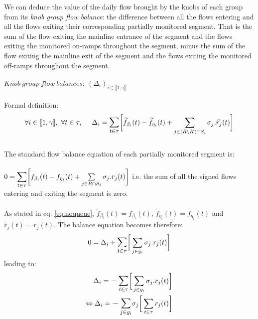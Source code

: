 We can deduce the value of the daily flow brought by the knobs of each group from its \emph{knob group flow balance}: the difference between all the flows entering and all the flows exiting their corresponding partially monitored segment. That is the sum of the flow exiting the mainline entrance of the segment and the flows exiting the monitored on-ramps throughout the segment, minus the sum of the flow exiting the mainline exit of the segment and the flows exiting the monitored off-ramps throughout the segment.\\ 
\\
$Knob\ group\ flow\ balances:\ (\Delta_{i})_{i\in \llbracket 1,\gamma \rrbracket} $\\
\\
Formal definition:\\
\begin{equation*}
\forall i \in \llbracket 1,\gamma \rrbracket,\ \forall t\in \tau,\ \ \ \ \Delta_{i} =\mathlarger{\sum\limits_{t\in \tau}}\bigg[\widetilde{f}_{\beta_{i}}(t)-\widetilde{f}_{\eta_{i}}(t)+\sum\limits_{j\in (R\backslash K)\cap S_{i}}\sigma_{j}.\widetilde{r_{j}}(t)\bigg]
\end{equation*}
\\
The standard flow balance equation of each partially monitored segment is:\\
\\
$0=\mathlarger{\sum\limits_{t\in \tau}}\bigg[f_{\beta_{i}}(t)-f_{\eta_{i}}(t)+\sum\limits_{j\in R\cap S_{i}}\sigma_{j}.r_{j}(t)\bigg]$   i.e. the sum of all the signed flows entering and exiting the segment is zero.\\
\\
As stated in eq. \ref{eq:noqueue}, $\widetilde{f}_{\beta_{i}}(t)=f_{\beta_{i}}(t)$, $\widetilde{f}_{\eta_{i}}(t)=f_{\eta_{i}}(t)$ and $\widetilde{r_{j}}(t)=r_{j}(t)$. The balance equation becomes therefore:\\
\begin{equation*}
0=\Delta_{i}+\mathlarger{\sum\limits_{t\in \tau}}\bigg[\sum\limits_{j\in g_{i}}\sigma_{j}.r_{j}(t)\bigg]
\end{equation*}
leading to:
\begin{align*}
\Delta_{i}=\mathlarger{-\sum\limits_{t\in \tau}}\bigg[\sum\limits_{j\in g_{i}}\sigma_{j}.r_{j}(t)\bigg]\\
\Leftrightarrow \Delta_{i}=\mathlarger{-\sum\limits_{j\in g_{i}}}\sigma_{j}\bigg[\sum\limits_{t\in \tau}r_{j}(t)\bigg]\\
\end{align*}
